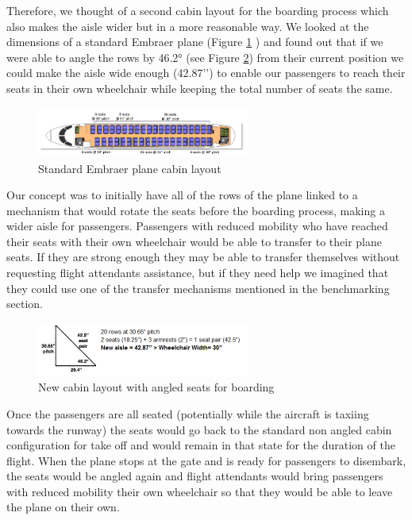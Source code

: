 Therefore, we thought of a second cabin layout for the boarding process which also makes the aisle wider but in a more reasonable way. We looked at the dimensions of a standard Embraer plane (Figure \ref{fig:embraer_plane} ) and found out that if we were able to angle the rows by 46.2° (see Figure \ref{fig:angled_seats}) from their current position we could make the aisle wide enough (42.87’’) to enable our passengers to reach their seats in their own wheelchair while keeping the total number of seats the same.

\begin{figure}[h]
  \centering
     \includegraphics[width=7cm]{images/embraer_plane.png}
   \caption{Standard Embraer plane cabin layout}
  \label{fig:embraer_plane}
\end{figure}

Our concept was to initially have all of the rows of the plane linked to a mechanism that would rotate the seats before the boarding process, making a wider aisle for passengers. Passengers with reduced mobility who have reached their seats with their own wheelchair would be able to transfer to their plane seats. If they are strong enough they may be able to transfer themselves without requesting flight attendants assistance, but if they need help we imagined that they could use one of the transfer mechanisms mentioned in the benchmarking section.
\begin{figure}[h]
  \centering
     \includegraphics[width=7cm]{images/angled_seats.png}
   \caption{New cabin layout with angled seats for boarding}
  \label{fig:angled_seats}
\end{figure}

Once the passengers are all seated (potentially while the aircraft is taxiing towards the runway) the seats would go back to the standard non angled cabin configuration for take off and would remain in that state for the duration of the flight. When the plane stops at the gate and is ready for passengers to disembark, the seats would be angled again and flight attendants would bring passengers with reduced mobility their own wheelchair so that they would be able to leave the plane on their own. 

